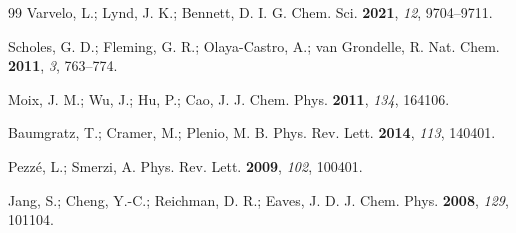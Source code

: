 \documentclass[11pt,a4paper]{article}
\begin{document}
\begin{thebibliography}{99}
Varvelo, L.; Lynd, J. K.; Bennett, D. I. G. Chem. Sci. \textbf{2021}, \textit{12}, 9704--9711.

Scholes, G. D.; Fleming, G. R.; Olaya-Castro, A.; van Grondelle, R. Nat. Chem. \textbf{2011}, \textit{3}, 763--774.

Moix, J. M.; Wu, J.; Hu, P.; Cao, J. J. Chem. Phys. \textbf{2011}, \textit{134}, 164106.

Baumgratz, T.; Cramer, M.; Plenio, M. B. Phys. Rev. Lett. \textbf{2014}, \textit{113}, 140401.

Pezz\'e, L.; Smerzi, A. Phys. Rev. Lett. \textbf{2009}, \textit{102}, 100401.

Jang, S.; Cheng, Y.-C.; Reichman, D. R.; Eaves, J. D. J. Chem. Phys. \textbf{2008}, \textit{129}, 101104.

\end{thebibliography}
\end{document}
